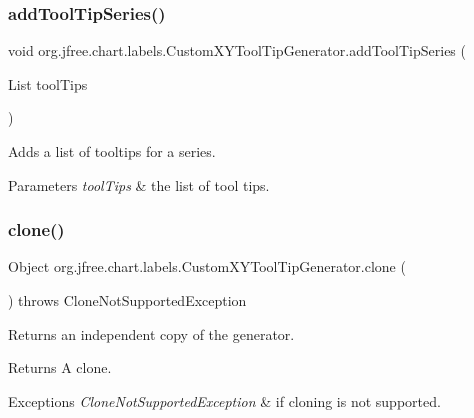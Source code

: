 \subsubsection{\texorpdfstring{add\+Tool\+Tip\+Series()}{addToolTipSeries()}}
{\footnotesize\ttfamily void org.\+jfree.\+chart.\+labels.\+Custom\+X\+Y\+Tool\+Tip\+Generator.\+add\+Tool\+Tip\+Series (\begin{DoxyParamCaption}\item[{List}]{tool\+Tips }\end{DoxyParamCaption})}

Adds a list of tooltips for a series.


\begin{DoxyParams}{Parameters}
{\em tool\+Tips} & the list of tool tips. \\
\hline
\end{DoxyParams}
\mbox{\label{classorg_1_1jfree_1_1chart_1_1labels_1_1_custom_x_y_tool_tip_generator_a986598b3ee670575238da07b5cd1f9da}} 
\subsubsection{\texorpdfstring{clone()}{clone()}}
{\footnotesize\ttfamily Object org.\+jfree.\+chart.\+labels.\+Custom\+X\+Y\+Tool\+Tip\+Generator.\+clone (\begin{DoxyParamCaption}{ }\end{DoxyParamCaption}) throws Clone\+Not\+Supported\+Exception}

Returns an independent copy of the generator.

\begin{DoxyReturn}{Returns}
A clone.
\end{DoxyReturn}

\begin{DoxyExceptions}{Exceptions}
{\em Clone\+Not\+Supported\+Exception} & if cloning is not supported. \\
\hline
\end{DoxyExceptions}
\mbox{\label{classorg_1_1jfree_1_1chart_1_1labels_1_1_custom_x_y_tool_tip_generator_a864822e9155e7c9aba85e9f4ec305570}} 
